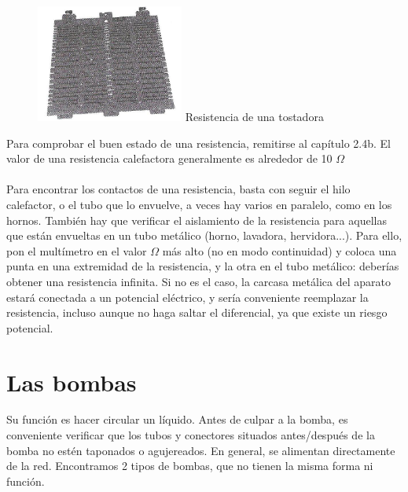 \documentclass[a5paper,twoside,openany]{book}
\begin{document}
\begin{figure}[h]
\begin{minipage}[t]{0.26\textwidth}
\includegraphics[width=\linewidth]{resistencia-tostadora}
Resistencia de una tostadora
\end{minipage}
\centering
\end{figure}
\vspace{1em}

Para comprobar el buen estado de una resistencia, remitirse al capítulo 2.4b. El valor de una resistencia calefactora generalmente es alrededor de 10 $\Omega$\\

\noindent{}\\

Para encontrar los contactos de una resistencia, basta con seguir el hilo calefactor, o el tubo que lo envuelve, a veces hay varios en paralelo, como en los hornos.
También hay que verificar el aislamiento de la resistencia para aquellas que están envueltas en un tubo metálico (horno, lavadora, hervidora...).
Para ello, pon el multímetro en el valor $\Omega$ más alto (no en modo continuidad) y coloca una punta en una extremidad de la resistencia, y la otra en el tubo metálico: deberías obtener una resistencia infinita.
Si no es el caso, la carcasa metálica del aparato estará conectada a un potencial eléctrico, y sería conveniente reemplazar la resistencia, incluso aunque no haga saltar el diferencial, ya que existe un riesgo potencial.
\newpage
\section{Las bombas}
Su función es hacer circular un líquido.
Antes de culpar a la bomba, es conveniente verificar que los tubos y conectores situados antes/después de la bomba no estén taponados o agujereados. En general, se alimentan directamente de la red. Encontramos 2 tipos de bombas, que no tienen la misma forma ni función.
\end{document}
